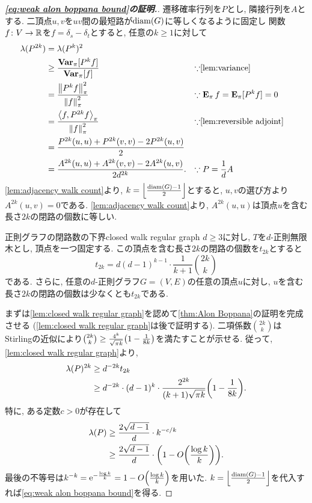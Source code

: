 \begin{proof}[\textbf{\cref{eq:weak alon boppana bound}の証明.}]
    遷移確率行列を$P$とし, 隣接行列を$A$とする.
    二頂点$u,v$を$uv$間の最短路が$\diam(G)$に等しくなるように固定し
    関数$f \colon V \to \Real$を$f = \delta_s - \delta_t$とすると, 任意の$k\ge 1$に対して
    \begin{align*}
        \lambda(P^{2k}) &= \lambda(P^k)^2 \\
        &\ge \frac{\Varpi[P^{k}f]}{\Varpi[f]} & & \text{$\because$\cref{lem:variance}}\\
        &= \frac{\pinorm{P^{k}f}^2}{\pinorm{f}^2} & & \text{$\because \Epi f=\Epi[P^{k}f] =0$} \\
        &= \frac{\piprod{f,P^{2k} f}}{\pinorm{f}^2} & & \text{$\because$\cref{lem:reversible adjoint}}\\
        &= \frac{P^{2k}(u,u) + P^{2k}(v,v) - 2P^{2k}(u,v)}{2} \\
        &= \frac{A^{2k}(u,u) + A^{2k}(v,v) - 2A^{2k}(u,v)}{2d^{2k}}. & & \text{$\because P=\frac{1}{d}A$}
    \end{align*}
    \cref{lem:adjacency walk count}より, $k=\floor*{\frac{\diam(G)-1}{2}}$とすると, $u,v$の選び方より$A^{2k}(u,v)=0$である.
    \cref{lem:adjacency walk count}より, $A^{2k}(u,u)$は頂点$u$を含む長さ$2k$の閉路の個数に等しい.

    \begin{lemma}{正則グラフの閉路数の下界}{closed walk regular graph}
        $d\ge 3$に対し, $T$を$d$-正則無限木とし, 頂点を一つ固定する.
        この頂点を含む長さ$2k$の閉路の個数を$t_{2k}$とすると
        \[ t_{2k} = d(d-1)^{k-1}\cdot \frac{1}{k+1}\binom{2k}{k} \]
        である.
        さらに,
        任意の$d$-正則グラフ$G=(V,E)$の任意の頂点$u$に対し, $u$を含む長さ$2k$の閉路の個数は少なくとも$t_{2k}$である.
    \end{lemma}

    まずは\cref{lem:closed walk regular graph}を認めて\cref{thm:Alon Boppana}の証明を完成させる (\cref{lem:closed walk regular graph}は後で証明する).
    二項係数$\binom{2k}{k}$はStirlingの近似により$\binom{2k}{k} \ge \frac{4^k}{\sqrt{\pi k}}\rbra*{1-\frac{1}{8k}}$を満たすことが示せる.
    従って, \cref{lem:closed walk regular graph}より,
    \begin{align*}
        \lambda(P)^{2k} &\ge d^{-2k} t_{2k} \\
        &\ge d^{-2k}\cdot (d-1)^k \cdot \frac{2^{2k}}{(k+1)\sqrt{\pi k}}\rbra*{1-\frac{1}{8k}}.
    \end{align*}
    特に, ある定数$c>0$が存在して
    \begin{align*}
        \lambda(P) &\ge \frac{2\sqrt{d-1}}{d} \cdot k^{-c/k} \\
        & \ge \frac{2\sqrt{d-1}}{d}\cdot \rbra*{1-O\rbra*{\frac{\log k}{k}}}.
    \end{align*}
    最後の不等号は$k^{-k}=\e^{-\frac{\log k}{k}} = 1-O\rbra*{\frac{\log k}{k}}$を用いた.
    $k=\floor*{\frac{\diam(G)-1}{2}}$を代入すれば\cref{eq:weak alon boppana bound}を得る.
\end{proof}
